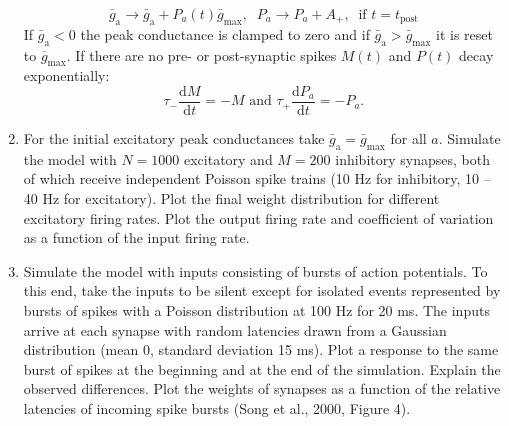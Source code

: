 \documentclass[12pt]{article}
\newcommand{\tderiv}[1]{\frac{\mathrm{d}#1}{\mathrm{d}t}}
\begin{document}
\begin{enumerate}
        \begin{equation} 
            \bar{g}_\mathrm{a} \rightarrow
            \bar{g}_\mathrm{a}+
            P_a(t)\bar{g}_\mathrm{max},\; \;
            P_a \rightarrow P_a + A_+, \; \;
            \text{if } t =
            t_\mathrm{post}
        \end{equation}
        If $\bar{g}_\mathrm{a}<0$ the peak conductance is clamped to zero and
        if $\bar{g}_\mathrm{a}>\bar{g}_\mathrm{max}$ it is reset to
        $\overline{g}_\mathrm{max}$. If there are no pre- or
        post-synaptic spikes $M(t)$ and $P(t)$ decay exponentially:
        \begin{equation}
            \tau_{-}\tderiv{M}=-M \text{ and } \tau_{+}\tderiv{P_a}=-P_a.
            \label{eq:stdp}
        \end{equation}


    \item For the initial excitatory peak conductances take
        $\bar{g}_\mathrm{a}=\bar{g}_\mathrm{max}$ for all $a$. Simulate the
        model with $N=1000$ excitatory and $M=200$ inhibitory synapses,
        both of which receive independent
        Poisson spike trains (10 Hz for inhibitory, 10 -- 40 Hz
        for excitatory). Plot the final weight distribution for
        different excitatory firing rates. Plot the output firing rate
        and coefficient of variation as a function of the input firing
        rate.

    \item Simulate the model with inputs consisting of bursts of
        action potentials. To this end, take the inputs to be silent
        except for isolated events represented by bursts of spikes
        with a Poisson distribution at 100 Hz for 20 ms. The inputs
        arrive at each synapse with random latencies drawn from a
        Gaussian distribution (mean 0, standard deviation 15 ms). Plot
        a response to the same burst of spikes at the beginning and
        at the end of the simulation. Explain the observed differences.
        Plot the weights of synapses as a function of the relative
        latencies of incoming spike bursts (Song et al., 2000, Figure 4).
\end{enumerate}
\end{document}
